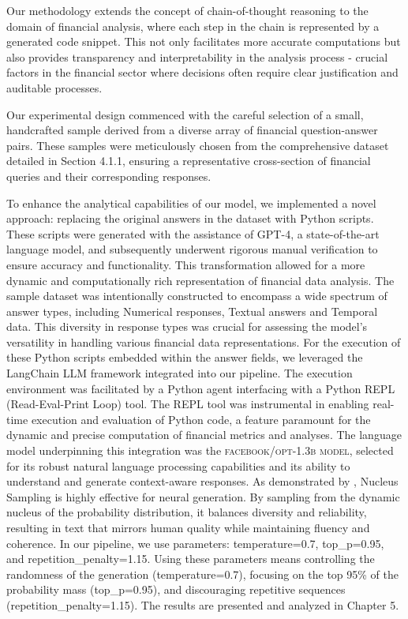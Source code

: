\documentclass[logo,msc]{infthesis}           %
\begin{document}
Our methodology extends the concept of chain-of-thought reasoning to the domain of financial analysis, where each step in the chain is represented by a generated code snippet. This not only facilitates more accurate computations but also provides transparency and interpretability in the analysis process - crucial factors in the financial sector where decisions often require clear justification and auditable processes.

Our experimental design commenced with the careful selection of a small, handcrafted sample derived from a diverse array of financial question-answer pairs. These samples were meticulously chosen from the comprehensive dataset detailed in Section 4.1.1, ensuring a representative cross-section of financial queries and their corresponding responses.

To enhance the analytical capabilities of our model, we implemented a novel approach: replacing the original answers in the dataset with Python scripts. These scripts were generated with the assistance of GPT-4, a state-of-the-art language model, and subsequently underwent rigorous manual verification to ensure accuracy and functionality. This transformation allowed for a more dynamic and computationally rich representation of financial data analysis. The sample dataset was intentionally constructed to encompass a wide spectrum of answer types, including Numerical responses, Textual answers and Temporal data. This diversity in response types was crucial for assessing the model's versatility in handling various financial data representations. For the execution of these Python scripts embedded within the answer fields, we leveraged the LangChain LLM framework integrated into our pipeline. The execution environment was facilitated by a Python agent interfacing with a Python REPL (Read-Eval-Print Loop) tool. The REPL tool was instrumental in enabling real-time execution and evaluation of Python code, a feature paramount for the dynamic and precise computation of financial metrics and analyses. The language model underpinning this integration was the \textsc{facebook/opt-1.3b model}, selected for its robust natural language processing capabilities and its ability to understand and generate context-aware responses. 
As demonstrated by \cite{holtzman2019curious}, Nucleus Sampling is highly effective for neural generation. By sampling from the dynamic nucleus of the probability distribution, it balances diversity and reliability, resulting in text that mirrors human quality while maintaining fluency and coherence. In our pipeline, we use parameters: temperature=0.7, top\_p=0.95, and repetition\_penalty=1.15. Using these parameters means controlling the randomness of the generation (temperature=0.7), focusing on the top 95\% of the probability mass (top\_p=0.95), and discouraging repetitive sequences (repetition\_penalty=1.15). The results are presented and analyzed in Chapter 5.
\end{document}
